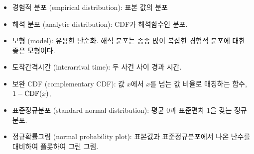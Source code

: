 \begin{itemize}

\item 경험적 분포 (empirical distribution): 표본 값의 분포 

\item 해석 분포 (analytic distribution): CDF가 해석함수인 분포.

\item 모형 (model): 유용한 단순화. 해석 분포는 종종 많이 복잡한 경험적 분포에 대한 좋은 모형이다.

\item 도착간격시간 (interarrival time): 두 사건 사이 경과 시간.

\item 보완 CDF (complementary CDF): 
값 $x$에서 $x$를 넘는 값 비율로 매칭하는 함수, $1 - \mathrm{CDF}(x)$.

\item 표준정규분포 (standard normal distribution): 
평균 0과 표준편차 1을 갖는 정규분포.

\item 정규확률그림 (normal probability plot): 표본값과 표준정규분포에서 나온 난수를 대비하여 플롯하여 그린 그림.

\end{itemize}

